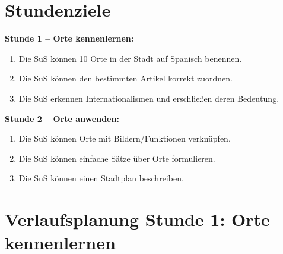 \documentclass[11pt,a4paper]{article}
\begin{document}
\vspace{1em}

\section*{Stundenziele}

\textbf{Stunde 1 -- Orte kennenlernen:}
\begin{enumerate}[nosep]
    \item Die SuS können 10 Orte in der Stadt auf Spanisch benennen.
    \item Die SuS können den bestimmten Artikel korrekt zuordnen.
    \item Die SuS erkennen Internationalismen und erschließen deren Bedeutung.
\end{enumerate}

\textbf{Stunde 2 -- Orte anwenden:}
\begin{enumerate}[nosep]
    \item Die SuS können Orte mit Bildern/Funktionen verknüpfen.
    \item Die SuS können einfache Sätze über Orte formulieren.
    \item Die SuS können einen Stadtplan beschreiben.
\end{enumerate}

\newpage

\section*{Verlaufsplanung Stunde 1: Orte kennenlernen}
\end{document}
